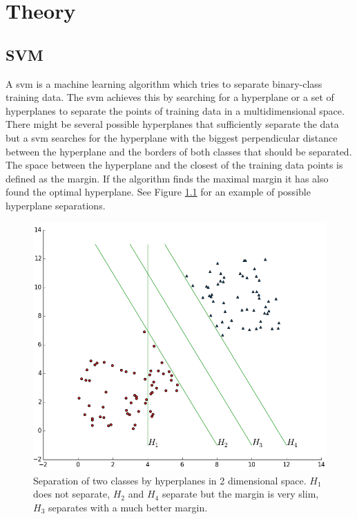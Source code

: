 
\chapter{Theory}\label{theory}

\section{SVM}
A \acrfull{svm} is a machine learning algorithm which tries to separate binary-class training data. The \gls{svm} achieves this by searching for a hyperplane or a set of hyperplanes to separate the points of training data in a multidimensional space. There might be several possible hyperplanes that sufficiently separate the data but a \gls{svm} searches for the hyperplane with the biggest perpendicular distance between the hyperplane and the borders of both classes that should be separated. The space between the hyperplane and the closest of the training data points is defined as the margin. If the algorithm finds the maximal margin it has also found the optimal hyperplane. See Figure \ref{fig:svmHyperplaneSeparation} for an example of possible hyperplane separations.

\begin{figure}[ht]
	\centering
	\includegraphics[scale=0.5]{figures/theorySVM_hyperplanes}
	\caption{Separation of two classes by hyperplanes in 2 dimensional space. $H_1$ does not separate, $H_2$ and $H_4$ separate but the margin is very slim, $H_3$ separates with a much better margin.}
	\label{fig:svmHyperplaneSeparation}
\end{figure}

